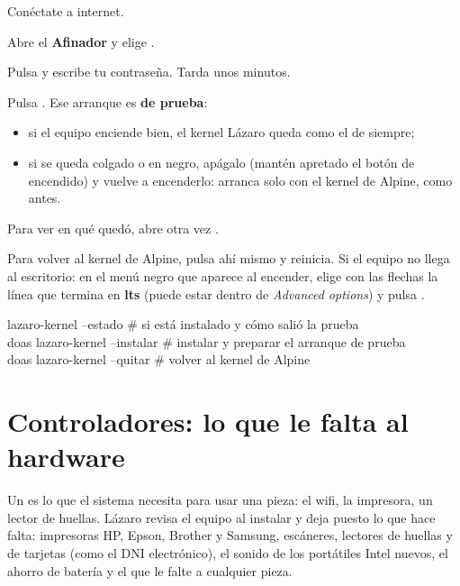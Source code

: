 \begin{pasos}
  \item Conéctate a internet.
  \item Abre el \textbf{Afinador} y elige .
  \item Pulsa  y escribe tu contraseña. Tarda unos
        minutos.
  \item Pulsa . Ese arranque es \textbf{de prueba}:
    \begin{itemize}
      \item si el equipo enciende bien, el kernel Lázaro queda como el de
            siempre;
      \item si se queda colgado o en negro, apágalo (mantén apretado el
            botón de encendido) y vuelve a encenderlo: arranca solo con el
            kernel de Alpine, como antes.
    \end{itemize}
  \item Para ver en qué quedó, abre otra vez .
\end{pasos}

Para volver al kernel de Alpine, pulsa ahí mismo  y reinicia. Si el equipo no llega al escritorio: en el menú negro
que aparece al encender, elige con las flechas la línea que termina en
\textbf{lts} (puede estar dentro de \emph{Advanced options}) y pulsa
.

\begin{terminal}
lazaro-kernel --estado            \# si está instalado y cómo salió la prueba\\
doas lazaro-kernel --instalar     \# instalar y preparar el arranque de prueba\\
doas lazaro-kernel --quitar       \# volver al kernel de Alpine
\end{terminal}

\section{Controladores: lo que le falta al hardware}\label{sec:controladores}


Un  es lo que el sistema necesita para usar una pieza:
el wifi, la impresora, un lector de huellas. Lázaro revisa el equipo al
instalar y deja puesto lo que hace falta: impresoras HP, Epson, Brother y
Samsung, escáneres, lectores de huellas y de tarjetas (como el DNI
electrónico), el sonido de los portátiles Intel nuevos, el ahorro de
batería y el  que le falte a cualquier pieza.

